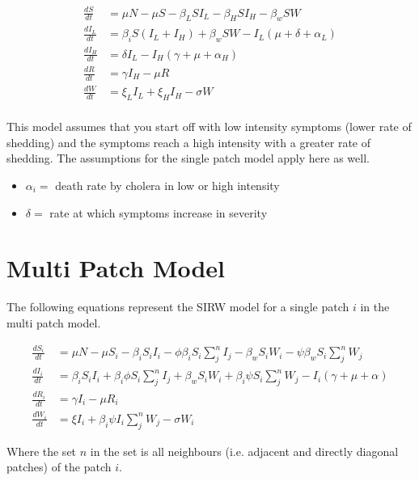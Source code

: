 \documentclass[12pt]{article}\usepackage[]{graphicx}\usepackage[]{color}
\begin{document}
\begin{linenomath}
\begin{align*}
	\frac{dS}{dt}&= \mu N - \mu S - \beta_L S I_L - \beta_H S I_H - \beta_w S W  \\
	\frac{dI_L}{dt}&= \beta_i S( I_L + I_H) + \beta_w S W - I_L (\mu + \delta + \alpha_L) \\
	\frac{dI_H}{dt}&= \delta I_L - I_H (\gamma + \mu + \alpha_H) \\
	\frac{dR}{dt}&= \gamma I_H - \mu R \\
	\frac{dW}{dt}&= \xi_L I_L + \xi_H I_H  - \sigma W\\
	\end{align*}
\end{linenomath}

This model assumes that you start off with low intensity symptoms (lower rate of shedding) and the symptoms reach a high intensity with a greater rate of shedding. The assumptions for the single patch model apply here as well.
\begin{itemize}
	\item$\alpha_i=$ death rate by cholera in low or high intensity
	\item$\delta =$ rate at which symptoms increase in severity
\end{itemize}

\section{Multi Patch Model}

The following equations represent the SIRW model for a single patch $i$ in the multi patch model.
\begin{linenomath}
\begin{align*}
    \frac{dS_i}{dt}&= \mu N - \mu S_i - \beta_i S_i I_i - \phi \beta_i S_i \sum_j^n I_j - \beta_w S_i W_i - \psi \beta_w S_i \sum_j^n W_j\\
    \frac{dI_i}{dt}&= \beta_i S_i I_i + \beta_i \phi S_i \sum_j^n I_j + \beta_w S_i W_i + \beta_i \psi S_i \sum_j^n W_j - I_i (\gamma + \mu + \alpha) \\
    \frac{dR_i}{dt}&= \gamma I_i - \mu R_i \\
    \frac{dW_i}{dt}&= \xi I_i + \beta_i \psi I_i \sum_j^n W_j  - \sigma W_i
\end{align*}
\end{linenomath}
Where the set $n$ in the set is all neighbours (i.e. adjacent and directly diagonal patches) of the patch $i$.
\end{document}
